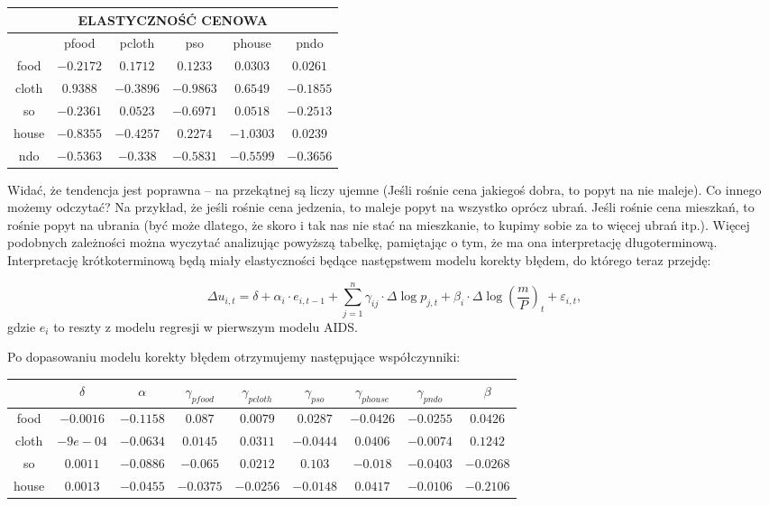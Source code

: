 \documentclass[11pt,a4paper]{report}
\begin{document}
\begin{center}
\begin{tabular}{|c|c|c|c|c|c|}
\hline
\multicolumn{6}{|c|}{ELASTYCZNOŚĆ CENOWA}  \\ \hline 
& pfood  & pcloth  & pso  & phouse  & pndo  \\  \hline
food  & $ -0.2172 $ & $ 0.1712 $ & $ 0.1233 $ & $ 0.0303 $ & $ 0.0261 $ \\  \hline 
cloth  & $ 0.9388 $ & $ -0.3896 $ & $ -0.9863 $ & $ 0.6549 $ & $ -0.1855 $ \\  \hline 
so  & $ -0.2361 $ & $ 0.0523 $ & $ -0.6971 $ & $ 0.0518 $ & $ -0.2513 $ \\  \hline 
house  & $ -0.8355 $ & $ -0.4257 $ & $ 0.2274 $ & $ -1.0303 $ & $ 0.0239 $ \\  \hline 
ndo  & $ -0.5363 $ & $ -0.338 $ & $ -0.5831 $ & $ -0.5599 $ & $ -0.3656 $ \\  \hline 
\end{tabular}
\end{center}

Widać, że tendencja jest poprawna -- na przekątnej są liczy ujemne (Jeśli rośnie cena jakiegoś dobra, to popyt na nie maleje). Co innego możemy odczytać? Na przykład, że jeśli rośnie cena jedzenia, to maleje popyt na wszystko oprócz ubrań. Jeśli rośnie cena mieszkań, to rośnie popyt na ubrania (być może dlatego, że skoro i tak nas nie stać na mieszkanie, to kupimy sobie za to więcej ubrań itp.). Więcej podobnych zależności można wyczytać analizując powyższą tabelkę, pamiętając o tym, że ma ona interpretację długoterminową. Interpretację krótkoterminową będą miały elastyczności będące następstwem modelu korekty błędem, do którego teraz przejdę:

$$
\Delta u_{i,t}= \delta + \alpha_i\cdot e_{i,t-1}  +\sum_{j=1}^n \gamma_{ij}\cdot \Delta\log{p_{j,t}} + \beta_i\cdot\Delta\log{(\frac{m}{P})_t}+ \varepsilon_{i,t},
$$
gdzie $e_i$ to reszty z modelu regresji w pierwszym modelu AIDS.

\bigskip

Po dopasowaniu modelu korekty błędem otrzymujemy następujące współczynniki:

\begin{center}
\begin{tabular}{|c|c|c|c|c|c|c|c|c|}
\hline
& $\delta$ & $\alpha$  & $\gamma_{pfood}$  & $\gamma_{pcloth}$  & $\gamma_{pso}$  & $\gamma_{phouse}$  & $\gamma_{pndo}$  & $\beta$  \\  \hline
food  & $ -0.0016 $ & $ -0.1158 $ & $ 0.087 $ & $ 0.0079 $ & $ 0.0287 $ & $ -0.0426 $ & $ -0.0255 $ & $ 0.0426 $ \\  \hline 
cloth  & $ -9e-04 $ & $ -0.0634 $ & $ 0.0145 $ & $ 0.0311 $ & $ -0.0444 $ & $ 0.0406 $ & $ -0.0074 $ & $ 0.1242 $ \\  \hline 
so  & $ 0.0011 $ & $ -0.0886 $ & $ -0.065 $ & $ 0.0212 $ & $ 0.103 $ & $ -0.018 $ & $ -0.0403 $ & $ -0.0268 $ \\  \hline 
house  & $ 0.0013 $ & $ -0.0455 $ & $ -0.0375 $ & $ -0.0256 $ & $ -0.0148 $ & $ 0.0417 $ & $ -0.0106 $ & $ -0.2106 $ \\  \hline 
\end{tabular}
\end{center}
\end{document}
